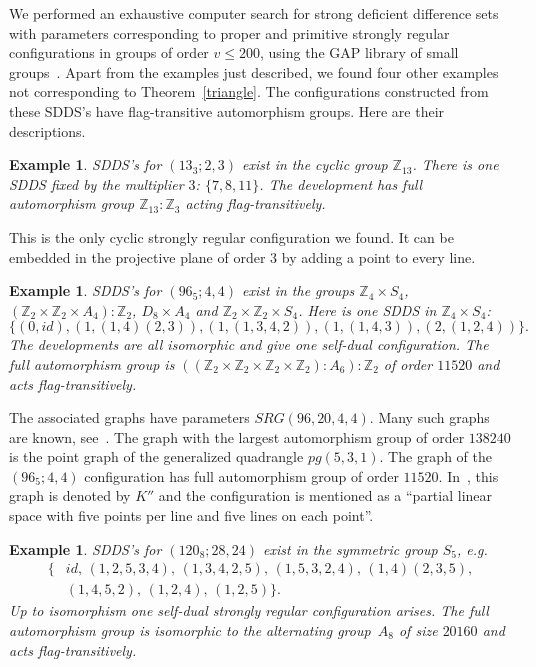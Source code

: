 \documentclass[12pt, reqno]{amsart}
\newtheorem{example}[theorem]{Example}
\def\Z{\mathbb{Z}}
\begin{document}
We performed an exhaustive computer search for strong deficient
difference sets with parameters corresponding to proper and primitive
strongly regular configurations in groups of order $v\le 200$, using
the GAP library of small groups~\cite{GAP4}.
Apart from the examples just described, we found four other examples
not corresponding to Theorem~\ref{triangle}. The
configurations constructed from these SDDS's have flag-transitive
automorphism groups. Here are their descriptions.

\begin{example}\label{sdds13}
SDDS's for $(13_3;2,3)$ exist in the cyclic group $\Z_{13}$. There is
one SDDS fixed by the multiplier $3$: $\{7,8,11\}$. The development
has full automorphism group $\Z_{13}:\Z_3$ acting flag-transitively.
\end{example}

This is the only cyclic strongly regular configuration we found. It
can be embedded in the projective plane of order $3$ by adding a
point to every line.

\begin{example}\label{sdds96}
SDDS's for $(96_5;4,4)$ exist in the groups $\Z_4 \times S_4$, $(\Z_2
\times \Z_2 \times A_4) : \Z_2$, $D_8\times A_4$ and $\Z_2 \times
\Z_2 \times S_4$. Here is one SDDS in $\Z_4\times S_4$:
$$\{(0,id), (1, (1,4)(2,3)), (1,(1,3,4,2)),
  (1, (1,4,3)), (2, (1,2,4)) \}.$$
The developments are all isomorphic and give one self-dual configuration.
The full automorphism group is $((\Z_2 \times \Z_2 \times \Z_2 \times \Z_2) : A_6) : \Z_2$ of
order $11520$ and acts flag-transitively.
\end{example}

The associated graphs have parameters $SRG(96,20,4,4)$. Many such graphs
are known, see~\cite{BKK03, GMV06}. The graph with the largest
automorphism group of order $138240$ is the point graph of the generalized
quadrangle $pg(5,3,1)$. The graph of the $(96_5;4,4)$
configuration has full automorphism group of order $11520$.
In~\cite{BKK03}, this graph is denoted by $K''$ and the configuration is
mentioned as a ``partial linear space with five points per line and five lines
on each point''.

\begin{example}\label{sdds120}
SDDS's for $(120_8;28,24)$ exist in the symmetric group $S_5$, e.g.
\begin{align*}
 \{ & id,\, (1,2,5,3,4),\, (1,3,4,2,5),\, (1,5,3,2,4),\, (1,4)(2,3,5), \\[1mm]
 & (1,4,5,2),\, (1,2,4),\, (1,2,5)\}.
\end{align*}
Up to isomorphism one self-dual strongly regular configuration arises.
The full automorphism group is isomorphic to the alternating group~$A_8$
of size $20160$ and acts flag-transitively.
\end{example}
\end{document}
